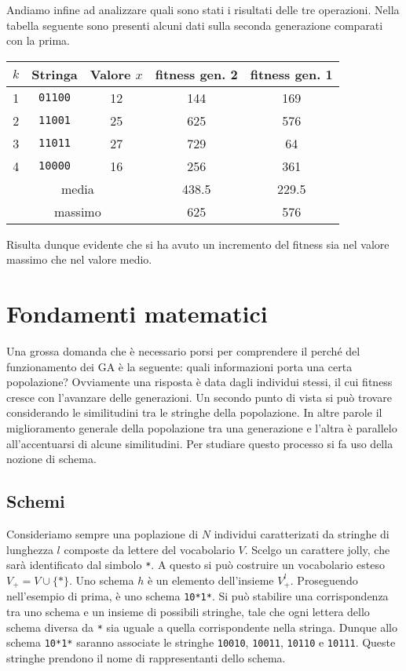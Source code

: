 \documentclass[a4paper, 11pt]{article}
\newcommand{\code}{\texttt}
\begin{document}
Andiamo infine ad analizzare quali sono stati i risultati delle tre operazioni.
Nella tabella seguente sono presenti alcuni dati sulla seconda generazione
comparati con la prima.
\begin{table}[h!]
\begin{tabular}{cccc|c}
\multicolumn{1}{c|}{$k$} & Stringa & Valore $x$ & fitness gen. 2 & fitness gen. 1 \\ \hline
\multicolumn{1}{c|}{1} & \code{01100} & 12 & 144 & 169 \\
\multicolumn{1}{c|}{2} & \code{11001} & 25 & 625 & 576 \\
\multicolumn{1}{c|}{3} & \code{11011} & 27 & 729 & 64 \\
\multicolumn{1}{c|}{4} & \code{10000} & 16 & 256 & 361 \\ \hline
\multicolumn{3}{c}{media} & 438.5 & 229.5 \\
\multicolumn{3}{c}{massimo} & 625 & 576
\end{tabular}
\end{table}

Risulta dunque evidente che si ha avuto un incremento del fitness sia nel valore
massimo che nel valore medio.




\section{Fondamenti matematici}

Una grossa domanda che è necessario porsi per comprendere il perché del
funzionamento dei GA è la seguente: quali informazioni porta una certa
popolazione? Ovviamente una risposta è data dagli individui stessi, il cui
fitness cresce con l'avanzare delle generazioni. Un secondo punto di vista si
può trovare considerando le similitudini tra le stringhe della popolazione. In
altre parole il miglioramento generale della popolazione tra una generazione e
l'altra è parallelo all'accentuarsi di alcune similitudini. Per studiare questo
processo si fa uso della nozione di schema.


\subsection{Schemi}

Consideriamo sempre una poplazione di $N$ individui caratterizati da stringhe di
lunghezza $l$ composte da lettere del vocabolario $V$. Scelgo un carattere
jolly, che sarà identificato dal simbolo \code{*}. A questo si può costruire un
vocabolario esteso $V_+=V \cup \{\code{*}\}$. Uno schema $h$ è un elemento
dell'insieme $V_+^l$. Proseguendo nell'esempio di prima, è uno schema
\code{10*1*}. Si può stabilire una corrispondenza tra uno schema e un insieme
di possibili stringhe, tale che ogni lettera dello schema diversa da \code{*}
sia uguale a quella corrispondente nella stringa. Dunque allo schema
\code{10*1*} saranno associate le stringhe \code{10010}, \code{10011},
\code{10110} e \code{10111}. Queste stringhe prendono il nome di rappresentanti
dello schema.
\end{document}
